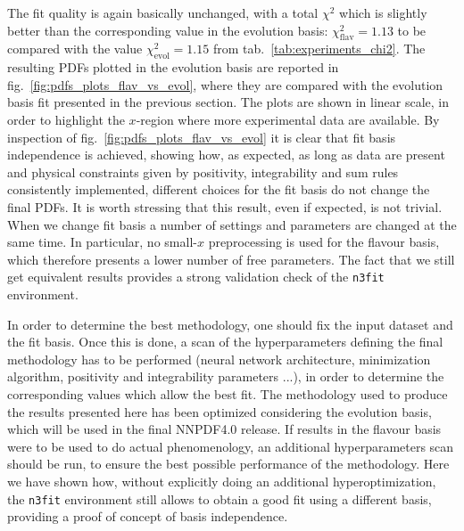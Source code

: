 %
The fit quality is again basically unchanged, with a total $\chi^2$ which is slightly better than the corresponding 
value in the evolution basis: $\chi_{\text{flav}}^2=1.13$ to be compared with the value $\chi_{\text{evol}}^2=1.15$ 
from tab.~\ref{tab:experiments_chi2}.
The resulting PDFs plotted in the evolution basis are reported in fig.~\ref{fig:pdfs_plots_flav_vs_evol}, 
where they are compared with the evolution basis fit presented in the previous section.
The plots are shown in linear scale, in order to highlight the $x$-region where more experimental data are available.
By inspection of fig.~\ref{fig:pdfs_plots_flav_vs_evol} it is clear that fit basis independence is achieved,
showing how, as expected, as long as data are present and physical constraints given by positivity, integrability and sum rules
consistently implemented, different choices for the fit basis do not change the final PDFs.
It is worth stressing that this result, even if expected, is not trivial. When we change fit basis a number
of settings and parameters are changed at the same time. In particular, no small-$x$ preprocessing
is used for the flavour basis, which therefore presents a lower number of free parameters.
The fact that we still get equivalent results provides a strong validation check of the {\tt n3fit} environment.

%
In order to determine the best methodology, one should fix the input dataset and the fit basis. Once this is done,
a scan of the hyperparameters defining the final methodology has to be performed 
(neural network architecture, minimization algorithm, positivity and integrability parameters ...), in order to determine
the corresponding values which allow the best fit.
The methodology used to produce the results presented here has been optimized considering the evolution basis,
which will be used in the final NNPDF4.0 release.  
If results in the flavour basis were to be used to do actual phenomenology, an additional hyperparameters scan
should be run, to ensure the best possible performance of the methodology. 
Here we have shown how, without explicitly doing an additional hyperoptimization, the {\tt n3fit} environment still
allows to obtain a good fit using a different basis, providing a proof of concept of basis independence.


